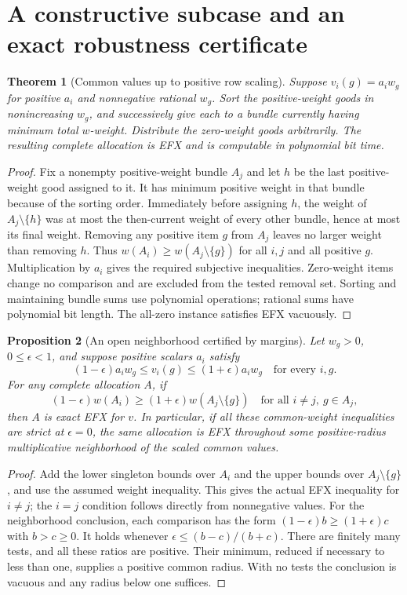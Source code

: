 \documentclass[11pt]{article}
\newtheorem{theorem}{Theorem}
\newtheorem{proposition}[theorem]{Proposition}
\theoremstyle{definition}
\begin{document}
\section{A constructive subcase and an exact robustness certificate}
\begin{theorem}[Common values up to positive row scaling]
Suppose $v_i(g)=a_iw_g$ for positive $a_i$ and nonnegative rational $w_g$.
Sort the positive-weight goods in nonincreasing $w_g$, and successively give
each to a bundle currently having minimum total $w$-weight. Distribute the
zero-weight goods arbitrarily. The resulting complete allocation is EFX and
is computable in polynomial bit time.
\end{theorem}
\begin{proof}
Fix a nonempty positive-weight bundle $A_j$ and let $h$ be the last
positive-weight good assigned to it. It has minimum positive weight in that
bundle because of the sorting order. Immediately before assigning $h$,
the weight of $A_j\setminus\{h\}$ was at most the then-current weight of
every other bundle, hence at most its final weight. Removing any positive
item $g$ from $A_j$ leaves no larger weight than removing $h$.
Thus $w(A_i)\geq w(A_j\setminus\{g\})$ for all $i,j$ and all positive $g$.
Multiplication by $a_i$ gives the required subjective inequalities. Zero-weight
items change no comparison and are excluded from the tested removal set.
Sorting and maintaining bundle sums use polynomial operations; rational sums
have polynomial bit length. The all-zero instance satisfies EFX vacuously.
\end{proof}

\begin{proposition}[An open neighborhood certified by margins]
Let $w_g>0$, $0\leq\epsilon<1$, and suppose positive scalars $a_i$ satisfy
\[
 (1-\epsilon)a_iw_g\leq v_i(g)\leq(1+\epsilon)a_iw_g
 \quad\text{for every }i,g.
\]
For any complete allocation $A$, if
\[
 (1-\epsilon)w(A_i)\geq(1+\epsilon)w(A_j\setminus\{g\})
 \quad\text{for all }i\ne j,\ g\in A_j,
\]
then $A$ is exact EFX for $v$. In particular, if all these common-weight
inequalities are strict at $\epsilon=0$, the same allocation is EFX throughout
some positive-radius multiplicative neighborhood of the scaled common values.
\end{proposition}
\begin{proof}
Add the lower singleton bounds over $A_i$ and the upper bounds over
$A_j\setminus\{g\}$, and use the assumed weight inequality. This gives the
actual EFX inequality for $i\ne j$; the $i=j$ condition follows directly from
nonnegative values. For the neighborhood conclusion, each comparison has the
form $(1-\epsilon)b\geq(1+\epsilon)c$ with $b>c\geq0$.
It holds whenever $\epsilon\leq(b-c)/(b+c)$. There are finitely many tests,
and all these ratios are positive. Their minimum, reduced if necessary to
less than one, supplies a positive common radius. With no tests the conclusion
is vacuous and any radius below one suffices.
\end{proof}
\end{document}
